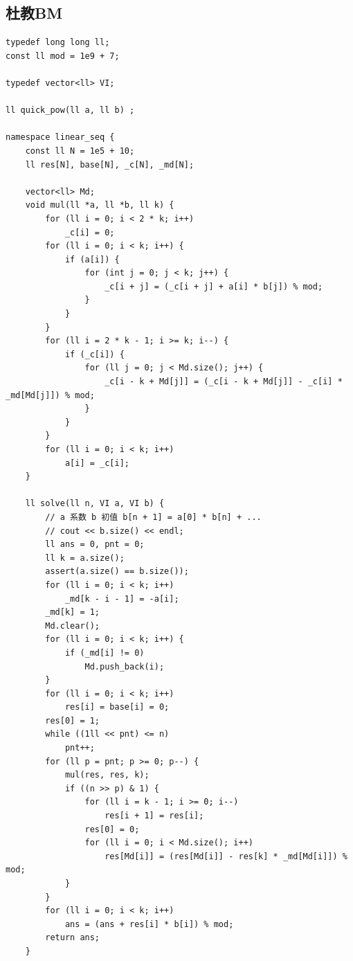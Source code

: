 \documentclass[twoside]{article}
\begin{document}
\subsection{杜教BM}
\begin{lstlisting}
typedef long long ll;
const ll mod = 1e9 + 7;

typedef vector<ll> VI;

ll quick_pow(ll a, ll b) ;

namespace linear_seq {
    const ll N = 1e5 + 10;
    ll res[N], base[N], _c[N], _md[N];

    vector<ll> Md;
    void mul(ll *a, ll *b, ll k) {
        for (ll i = 0; i < 2 * k; i++)
            _c[i] = 0;
        for (ll i = 0; i < k; i++) {
            if (a[i]) {
                for (int j = 0; j < k; j++) {
                    _c[i + j] = (_c[i + j] + a[i] * b[j]) % mod;
                }
            }
        }
        for (ll i = 2 * k - 1; i >= k; i--) {
            if (_c[i]) {
                for (ll j = 0; j < Md.size(); j++) {
                    _c[i - k + Md[j]] = (_c[i - k + Md[j]] - _c[i] * _md[Md[j]]) % mod;
                }
            }
        }
        for (ll i = 0; i < k; i++)
            a[i] = _c[i];
    }

    ll solve(ll n, VI a, VI b) {
        // a 系数 b 初值 b[n + 1] = a[0] * b[n] + ...
        // cout << b.size() << endl;
        ll ans = 0, pnt = 0;
        ll k = a.size();
        assert(a.size() == b.size());
        for (ll i = 0; i < k; i++)
            _md[k - i - 1] = -a[i];
        _md[k] = 1;
        Md.clear();
        for (ll i = 0; i < k; i++) {
            if (_md[i] != 0)
                Md.push_back(i);
        }
        for (ll i = 0; i < k; i++)
            res[i] = base[i] = 0;
        res[0] = 1;
        while ((1ll << pnt) <= n)
            pnt++;
        for (ll p = pnt; p >= 0; p--) {
            mul(res, res, k);
            if ((n >> p) & 1) {
                for (ll i = k - 1; i >= 0; i--)
                    res[i + 1] = res[i];
                res[0] = 0;
                for (ll i = 0; i < Md.size(); i++)
                    res[Md[i]] = (res[Md[i]] - res[k] * _md[Md[i]]) % mod;
            }
        }
        for (ll i = 0; i < k; i++)
            ans = (ans + res[i] * b[i]) % mod;
        return ans;
    }


\end{lstlisting}
\end{document}
